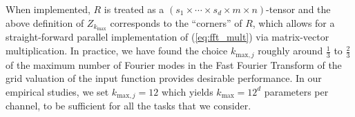 When implemented, $R$ is treated as a $(s_1 \times \cdots \times s_d \times m \times n)$-tensor and the above definition of $Z_{k_{\text{max}}}$ corresponds to the ``corners'' of $R$, which allows for a straight-forward parallel implementation of (\ref{eq:fft_mult}) via matrix-vector multiplication. 
In practice, we have found the choice $k_{\text{max},j}$ roughly around $\frac{1}{3}$ to $\frac{2}{3}$ of the maximum number of Fourier modes in the Fast Fourier Transform of the grid valuation of the input function provides desirable performance. In our empirical studies, we set $k_{\text{max},j}=12$  which yields $k_{\text{max}} = 12^d$ parameters per channel, to be sufficient for all the tasks that we consider.







